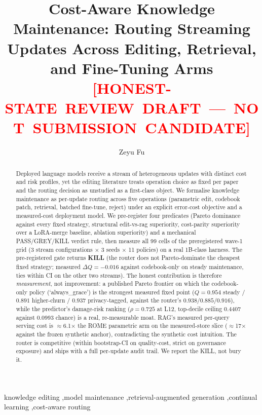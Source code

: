 \documentclass[preprint,12pt]{elsarticle}
\begin{document}
\begin{frontmatter}

\title{Cost-Aware Knowledge Maintenance: Routing Streaming Updates
Across Editing, Retrieval, and Fine-Tuning Arms\\[0.5em]
\mbox{\textcolor{red}{\scriptsize\bfseries [HONEST-STATE REVIEW DRAFT --- NOT SUBMISSION CANDIDATE]}}}

\author[1]{Zeyu Fu}

\begin{abstract}
Deployed language models receive a stream of heterogeneous updates with distinct
cost and risk profiles, yet the editing literature treats operation choice as fixed
per paper and the routing decision as unstudied as a first-class object. We
formalise knowledge maintenance as per-update routing across five operations
(parametric edit, codebook patch, retrieval, batched fine-tune, reject) under an
explicit error-cost objective and a measured-cost deployment model. We
pre-register four predicates (Pareto dominance against every fixed strategy,
structural edit-vs-rag superiority, cost-parity superiority over a
LoRA-merge baseline, ablation superiority) and a mechanical PASS/GREY/KILL
verdict rule, then measure all 99 cells of the preregistered wave-1 grid
(3 stream configurations $\times$ 3 seeds $\times$ 11 policies) on a real 1B-class harness.
The pre-registered gate returns \textbf{KILL} (the router does not
Pareto-dominate the cheapest fixed strategy; measured $\Delta Q = -0.016$ against
codebook-only on steady maintenance, ties within CI on the other two streams).
The honest contribution is
therefore \emph{measurement}, not improvement: a published Pareto frontier on
which the codebook-only policy (`always\_grace') is the strongest measured fixed point
($Q = 0.954$ steady / $0.891$ higher-churn / $0.937$ privacy-tagged, against the
router's $0.938 / 0.885 / 0.916$), while the predictor's damage-risk ranking ($\rho = 0.725$ at L12,
top-decile ceiling 0.4407 against 0.0993 chance) is a real, re-measurable
moat. RAG's measured per-query serving cost is $\approx$6.1$\times$ the ROME
parametric arm on the measured-store slice ($\approx$17$\times$ against the frozen
synthetic anchor), contradicting the synthetic cost intuition. The router is
competitive (within bootstrap-CI on quality-cost, strict on governance
exposure) and ships with a full per-update audit trail. We report the KILL,
not bury it.
\end{abstract}

\begin{keyword}
knowledge editing \sep model maintenance \sep retrieval-augmented generation
\sep continual learning \sep cost-aware routing
\end{keyword}

\end{frontmatter}
\end{document}
